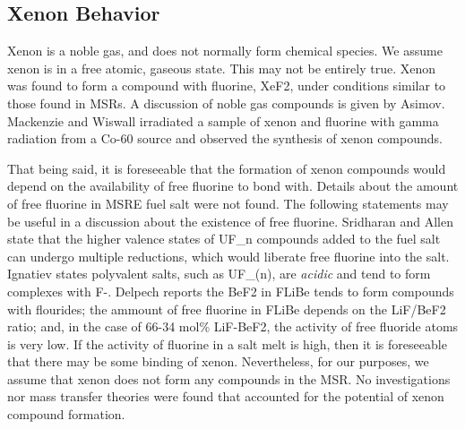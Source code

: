 \subsection{Xenon Behavior}
Xenon is a noble gas,  and does not normally form chemical species. We assume xenon is in a free atomic, gaseous state.  This may not be entirely true.  Xenon was found to form a compound with fluorine, XeF2, under conditions similar to those found in MSRs.  \cite{Tram06} A discussion of noble gas compounds is given by Asimov. \cite[p. 228]{Asimov79} Mackenzie and Wiswall irradiated a sample of xenon and fluorine with gamma radiation from a Co-60 source and observed the synthesis of xenon compounds. \cite{MacKenzie1963}  

That being said, it is foreseeable that the formation of xenon compounds would depend on the availability of free fluorine to bond with.  Details about the amount of free fluorine in MSRE fuel salt were not found. The following statements may be useful in a discussion about the existence of free fluorine.  Sridharan and Allen state that the higher valence states of UF\_n compounds added to the fuel salt can undergo multiple reductions, which would liberate free fluorine into the salt.  \cite[p. 252]{Lantelme13} Ignatiev states polyvalent salts, such as UF\_(n), are \textit{acidic} and tend to form complexes with F-.  \cite[p. 266]{Gaune12}  Delpech reports the BeF2 in FLiBe tends to form compounds with flourides; the ammount of free fluorine in FLiBe depends on the LiF/BeF2 ratio; and, in the case of 66-34 mol\% LiF-BeF2, the activity of free fluoride atoms is very low. 
\cite[p. 39]{Delpech2010} If the activity of fluorine in a salt melt is high, then it is foreseeable that there may be some binding of xenon.  Nevertheless, for our purposes, we  assume that xenon does not form any compounds in the MSR.   No investigations nor mass transfer theories were found that accounted for the potential of xenon compound formation.

